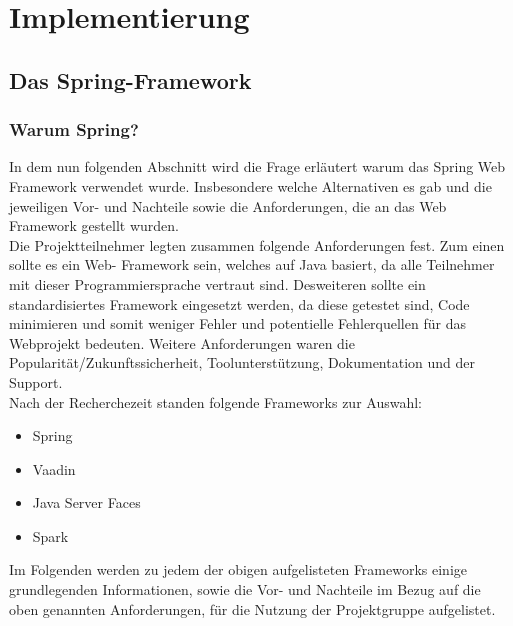 \chapter{Implementierung}

\section{Das Spring-Framework}
\subsection{Warum Spring?}
In dem nun folgenden Abschnitt wird die Frage erläutert warum das Spring Web Framework verwendet 
wurde. Insbesondere welche Alternativen es gab und die jeweiligen Vor- und Nachteile sowie die 
Anforderungen, die an das Web Framework gestellt wurden. \\
Die Projektteilnehmer legten zusammen folgende Anforderungen fest. Zum einen sollte es ein Web-
Framework sein, welches auf Java basiert, da alle Teilnehmer mit dieser Programmiersprache vertraut 
sind. Desweiteren sollte ein standardisiertes Framework eingesetzt werden, da diese getestet sind, 
Code minimieren und somit weniger Fehler und potentielle Fehlerquellen für das Webprojekt bedeuten. 
Weitere Anforderungen waren die Popularität/Zukunftssicherheit, Toolunterstützung, Dokumentation 
und der Support. \\
Nach der Recherchezeit standen folgende Frameworks zur Auswahl:
\begin{itemize}
  \item Spring
  \item Vaadin
  \item Java Server Faces 
  \item Spark
\end{itemize}
\medskip
Im Folgenden werden zu jedem der obigen aufgelisteten Frameworks einige grundlegenden 
Informationen, sowie die Vor- und Nachteile im Bezug auf die oben genannten Anforderungen, für die 
Nutzung der Projektgruppe aufgelistet. 
